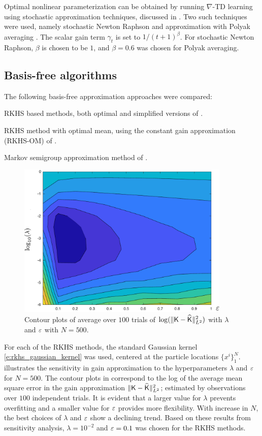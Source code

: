 Optimal nonlinear parameterization can be obtained by running $\nabla$-TD learning using stochastic approximation techniques, discussed in . Two such techniques were used, namely stochastic Newton Raphson and approximation with Polyak averaging \cite{bor08a}. The scalar gain term $\gamma_t$ is set to $1/(t+1)^{\beta}$. For stochastic Newton Raphson, $\beta$ is chosen to be $1$, and $\beta=0.6$ was chosen for Polyak averaging.

\subsection*{Basis-free algorithms}
The following basis-free approximation approaches were compared:
\begin{romannum}
\item RKHS based methods, both optimal and simplified versions of .
\item RKHS method with optimal mean, using the constant gain approximation (RKHS-OM) of .
\item Markov semigroup approximation method of .
\end{romannum}
\begin{figure}[htbp]
	\centering
	\includegraphics[width = 4in]{images/Chap4_log_mse_contour_2m}
	\caption{Contour plots of average over $100$ trials of $\log(\|\text{\sf K} - \widehat{\text{\sf K}}\|^2_{L^2})$ with $\lambda$ and $\varepsilon$ with $N=500$.}
	\label{fig:log_mse_contour}
\end{figure}
 For each of the RKHS methods, the standard Gaussian kernel \eqref{e:rkhs_gaussian_kernel} was used, centered at the particle locations $\{x^i\}_1^N$.  illustrates the sensitivity in gain approximation to the hyperparameters $\lambda$ and $\varepsilon$ for $N=500$. The contour plots in  correspond to the log of the average mean square error in the gain approximation $\|\text{\sf K} - \widehat{\text{\sf K}} \|^2_{L^2}$; estimated by observations over $100$ independent trials. It is evident that a larger value for $\lambda$ prevents overfitting and a smaller value for $\varepsilon$ provides more flexibility. With increase in $N$, the best choices of $\lambda$ and $\varepsilon$ show a declining trend. Based on these results from sensitivity analysis, $\lambda = 10^{-2}$ and $\varepsilon = 0.1$ was chosen for the RKHS methods.

